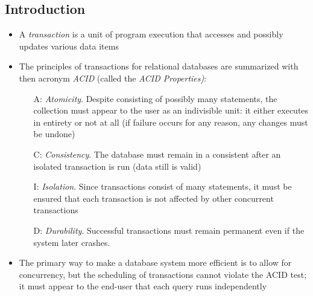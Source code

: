\documentclass[a4paper]{article}
\begin{document}
\subsection{Introduction}
\begin{itemize}
    \item A \emph{transaction} is a unit of program execution that accesses and possibly updates various data items
    \item The principles of transactions for relational databases are summarized with then acronym \emph{ACID} (called the \emph{ACID Properties)}:
    \begin{itemize}
        \item[A:] \emph{Atomicity}. Despite consisting of possibly many statements, the collection must appear to the user as an indivisible unit: it either executes in entirety or not at all (if failure occurs for any reason, any changes must be undone)
        \item[C:] \emph{Consistency}. The database must remain in a consistent after an isolated transaction is run (data still is valid)
        \item[I:] \emph{Isolation}. Since transactions consist of many statements, it must be ensured that each transaction is not affected by other concurrent transactions
        \item[D:] \emph{Durability}. Successful transactions must remain permanent even if the system later crashes.
    \end{itemize}
    \item The primary way to make a database system more efficient is to allow for concurrency, but the scheduling of transactions cannot violate the ACID test; it must appear to the end-user that each query runs independently
\end{itemize}
\end{document}
